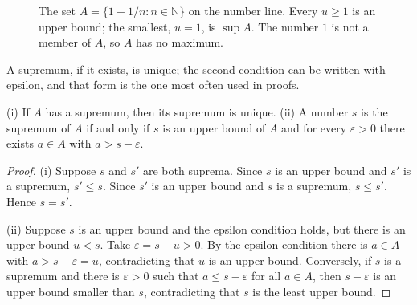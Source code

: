 \begin{figure}[htbp]
\centering
{}
\caption{The set $A=\{1-1/n:n\in\mathbb{N}\}$ on the number line. Every $u\ge 1$
is an upper bound; the smallest, $u=1$, is $\sup A$. The number $1$ is not a member of
$A$, so $A$ has no maximum.}
\label{fig:sup-garis}
\end{figure}


A supremum, if it exists, is unique; the second condition can be written with epsilon,
and that form is the one most often used in proofs.

\begin{lemma}
(i) If $A$ has a supremum, then its supremum is unique. (ii) A number $s$ is the
supremum of $A$ if and only if $s$ is an upper bound of $A$ and for every
$\varepsilon>0$ there exists $a\in A$ with $a>s-\varepsilon$.
\end{lemma}

\begin{proof}
(i) Suppose $s$ and $s'$ are both suprema. Since $s$ is an upper bound and $s'$ is a
supremum, $s'\le s$. Since $s'$ is an upper bound and $s$ is a supremum, $s\le s'$.
Hence $s=s'$.

(ii) Suppose $s$ is an upper bound and the epsilon condition holds, but there is an
upper bound $u<s$. Take $\varepsilon=s-u>0$. By the epsilon condition there is
$a\in A$ with $a>s-\varepsilon=u$, contradicting that $u$ is an upper bound.
Conversely, if $s$ is a supremum and there is $\varepsilon>0$ such that
$a\le s-\varepsilon$ for all $a\in A$, then $s-\varepsilon$ is an upper bound smaller
than $s$, contradicting that $s$ is the least upper bound.
\end{proof}

